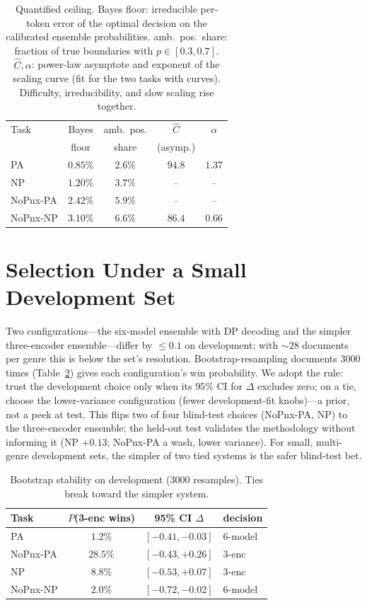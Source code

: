 \begin{table}[t]\centering\small
\begin{tabular}{lcccc}
\toprule
Task & Bayes & amb.\ pos. & $\hat C$ & $\alpha$ \\
 & floor & share & (asymp.) & \\
\midrule
PA       & $0.85\%$ & $2.6\%$ & $94.8$ & $1.37$ \\
NP       & $1.20\%$ & $3.7\%$ & --     & --     \\
NoPnx-PA & $2.42\%$ & $5.9\%$ & --     & --     \\
NoPnx-NP & $3.10\%$ & $6.6\%$ & $86.4$ & $0.66$ \\
\bottomrule
\end{tabular}
\caption{Quantified ceiling. Bayes floor: irreducible per-token error of the optimal
decision on the calibrated ensemble probabilities. amb.\ pos.\ share: fraction of
true boundaries with $p\in[0.3,0.7]$. $\hat C,\alpha$: power-law asymptote and
exponent of the scaling curve (fit for the two tasks with curves). Difficulty,
irreducibility, and slow scaling rise together.}
\label{tab:ceiling}
\end{table}


\section{Selection Under a Small Development Set}\label{sec:boot}
Two configurations---the six-model ensemble with DP decoding and the simpler
three-encoder ensemble---differ by $\le0.1$ \fone{} on development; with $\sim$$28$
documents per genre this is below the set's resolution. Bootstrap-resampling
documents $3000$ times (Table~\ref{tab:bootstrap}) gives each configuration's win
probability. We adopt the rule: trust the development choice only when its $95\%$ CI
for $\Delta$\fone{} excludes zero; on a tie, choose the lower-variance configuration
(fewer development-fit knobs)---a prior, not a peek at test. This flips two of four
blind-test choices (NoPnx-PA, NP) to the three-encoder ensemble; the held-out test
validates the methodology without informing it (NP $+0.13$; NoPnx-PA a wash, lower
variance). For small, multi-genre development sets, the simpler of two tied systems
is the safer blind-test bet.

\begin{table}[t]\centering\small
\begin{tabular}{lccl}
\toprule
Task & $P$(3-enc wins) & 95\% CI $\Delta$\fone{} & decision \\
\midrule
PA       & $1.2\%$  & $[-0.41,-0.03]$ & 6-model \\
NoPnx-PA & $28.5\%$ & $[-0.43,+0.26]$ & 3-enc \\
NP       & $8.8\%$  & $[-0.53,+0.07]$ & 3-enc \\
NoPnx-NP & $2.0\%$  & $[-0.72,-0.02]$ & 6-model \\
\bottomrule
\end{tabular}
\caption{Bootstrap stability on development ($3000$ resamples). Ties break toward
the simpler system.}
\label{tab:bootstrap}
\end{table}

